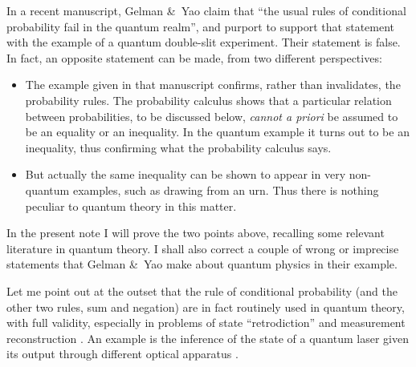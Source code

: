 \documentclass[\ifafour a4paper,12pt,\else a5paper,10pt,\fi%
onecolumn,oneside,article,%
british%
]{memoir}
\theoremstyle{remark}
\theoremstyle{innote}
\newcommand*{\citep}{\parencites}%
\newcommand*{\citey}{\parencites*}
\newcommand*{\amp}{\&}
\renewcommand*{\|}[1][]{\nonscript\,#1\vert\nonscript\;\mathopen{}}
\newcommand*{\sect}{\S}%
\newcommand*{\chaps}{chs}%
\begin{document}
In a recent manuscript, Gelman \amp\ Yao \citey{gelmanetal2020} claim that
\enquote{the usual rules of conditional probability fail in the quantum
  realm}, and purport to support that statement with the example of a
quantum double-slit experiment. Their statement is
false. %
In fact, an opposite statement can be made, from two different
perspectives: %
\begin{itemize}
\item The example given in that manuscript confirms, rather than
  invalidates, the probability rules. The probability calculus shows that a
  particular relation between probabilities, to be discussed below,
  \emph{cannot a priori} be assumed to be an equality or an inequality. In
  the quantum example it turns out to be an inequality, thus confirming
  what the probability calculus says.
\item But actually the same inequality can be shown to appear in very
  non-quantum examples, such as drawing from an urn. Thus there is nothing
  peculiar to quantum theory in this matter.
\end{itemize}

In the present note I will prove the two points above, recalling some
relevant literature in quantum theory. I shall also correct a couple of
wrong or imprecise statements that Gelman \amp\ Yao make about quantum
physics in their example.

Let me point out at the outset that the rule of conditional probability
(and the other two rules, sum and negation) are in fact routinely used in
quantum theory, with full validity, especially in problems of state
\enquote{retrodiction} and measurement reconstruction
\citep{jones1991b,slater1995b}[\chaps~7,8]{demuynck2002b}{barnettetal2003,zimanetal2004_r2006,darianoetal2004}[see][\sect~1
and the rest of the present note for many further
references]{maanssonetal2006}. An example is the inference of the state of
a quantum laser given its output through different optical apparatus
\citep{leonhardt1997}.
\end{document}
